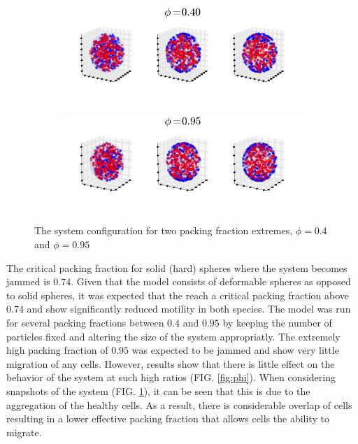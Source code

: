 \documentclass[aps,prb,twocolumn,groupedaddress,nofootinbib,floatfix]{revtex4}
\begin{document}
\begin{figure}
  \begin{subfigure}{\columnwidth}
    \includegraphics[width=1.0\columnwidth]{images/configs_40.png}
  \end{subfigure}
  \begin{subfigure}{\columnwidth}
    \includegraphics[width=1.0\columnwidth]{images/configs_95.png}
  \end{subfigure}
  \caption{The system configuration for two packing fraction extremes, $\phi=0.4$ and $\phi=0.95$}
  \label{fig:packing_configs}
\end{figure}

The critical packing fraction for solid (hard)  spheres where the system becomes jammed is $0.74$.
Given that the model consists of deformable spheres as opposed to solid spheres, it was expected that the reach a critical packing fraction above $0.74$ and show significantly reduced motility in both species.
The model was run for several packing fractions between $0.4$ and $0.95$ by keeping the number of particles fixed and altering the size of the system appropriatly.
The extremely high packing fraction of $0.95$ was expected to be jammed and show very little migration of any cells.
However, results show that there is little effect on the behavior of the system at such high ratios (FIG. \ref{fig:phi}).
When considering snapshots of the system (FIG. \ref{fig:packing_configs}), it can be seen that this is due to the aggregation of the healthy cells.
As a result, there is considerable overlap of cells resulting in a lower effective packing fraction that allows cells the ability to migrate.
\end{document}
